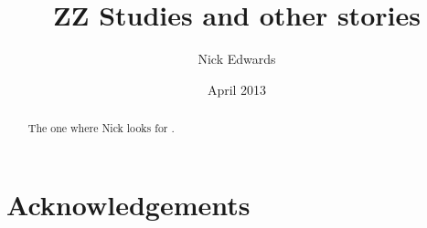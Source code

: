 \documentclass[a4paper]{report}
\begin{document}
\title{ZZ Studies and other stories}
\author{Nick Edwards}
\date{April 2013}

\maketitle

\tableofcontents
\listoffigures
\listoftables

\chapter*{Acknowledgements}

\begin{abstract}
The one where Nick looks for \ZZ.
\end{abstract}








\end{document}
